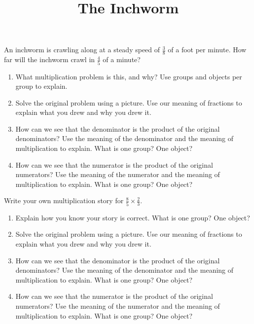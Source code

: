 \documentclass[nooutcomes,noauthor]{ximera}
\title{The Inchworm}
\begin{document}
\begin{abstract}
\end{abstract}

\maketitle


\begin{problem}
An inchworm is crawling along at a steady speed of $\frac{3}{8}$ of a foot per minute. How far will the inchworm crawl in $\frac{4}{5}$ of a minute?

\begin{enumerate}
	\item What multiplication problem is this, and why? Use groups and objects per group to explain.
	\item Solve the original problem using a picture. Use our meaning of fractions to explain what you drew and why you drew it.
	\item How can we see that the denominator is the product of the original denominators? Use the meaning of the denominator and the meaning of multiplication to explain. What is one group? One object?
	\item How can we see that the numerator is the product of the original numerators? Use the meaning of the numerator and the meaning of multiplication to explain. What is one group? One object?
\end{enumerate}
\end{problem}



\begin{problem}
Write your own multiplication story for $\frac{8}{5} \times \frac{2}{3}$.
\begin{enumerate}
	\item Explain how you know your story is correct. What is one group? One object?
	\item Solve the original problem using a picture. Use our meaning of fractions to explain what you drew and why you drew it.
	\item How can we see that the denominator is the product of the original denominators? Use the meaning of the denominator and the meaning of multiplication to explain. What is one group? One object?
	\item How can we see that the numerator is the product of the original numerators? Use the meaning of the numerator and the meaning of multiplication to explain. What is one group? One object?
\end{enumerate}
\end{problem}
\end{document}
